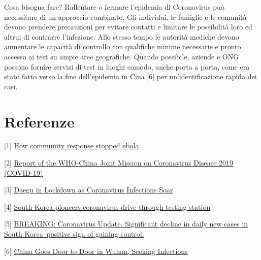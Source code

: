 \documentclass[onecolumn,journal]{IEEEtran}
\begin{document}
\begin{multicols}{2}
Cosa bisogna fare? Rallentare o fermare l’epidemia di Coronavirus può necessitare di un approccio combinato. Gli individui, le famiglie e le comunità devono prendere precauzioni per evitare contatti e limitare le possibilità loro ed altrui di contrarre l’infezione. Allo stesso tempo le autorità mediche devono aumentare le capacità di controllo con qualifiche minime necessarie e pronto accesso ai test su ampie aree geografiche. Quando possibile, aziende e ONG possono fornire servizi di test in luoghi comodo, anche porta a porta, come era stato fatto verso la fine dell’epidemia in Cina [6] per un’identificazione rapida dei casi.

\section*{Referenze}

[1] \href{https://necsi.edu/how-community-response-stopped-ebola}{How community response stopped ebola}

[2] \href{https://www.who.int/docs/default-source/coronaviruse/who-china-joint-mission-on-covid-19-final-report.pdf}{Report of the WHO-China Joint Mission on Coronavirus Disease 2019 (COVID-19)}

[3] \href{http://english.chosun.com/site/data/html_dir/2020/02/24/2020022401353.html}{Daegu in Lockdown as Coronavirus Infections Soar}

[4] \href{https://www.cnn.com/2020/03/02/asia/coronavirus-drive-through-south-korea-hnk-intl/index.html}{South Korea pioneers coronavirus drive-through testing station}

[5] \href{https://twitter.com/yaneerbaryam/status/1235734017699430401?s=20}{BREAKING: Coronavirus Update. Significant decline in daily new cases in South Korea--positive sign of gaining control.}

[6] \href{https://www.courthousenews.com/china-goes-door-to-door-in-wuhan-seeking-infections/}{China Goes Door to Door in Wuhan, Seeking Infections}












\end{multicols}
\end{document}
